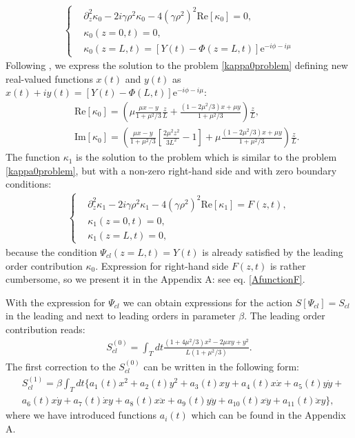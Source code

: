 \documentclass{article}
\begin{document}
\begin{eqnarray}\label{kappa0problem}
    \begin{cases}
        & \partial_{z}^{2}\kappa_{0} - 2i\gamma \rho^{2}\kappa_{0} - 4(\gamma \rho^{2})^{2}\textrm{Re}[\kappa_{0}] = 0, \\
        &\kappa_{0}(z=0,t) = 0, \\
        &\kappa_{0}(z=L,t) = \left[Y(t)-\Phi(z=L,t)\right]\textrm{e}^{-i\phi-i\mu} 
    \end{cases}
\end{eqnarray}
Following \cite{terekhov2017log}, we express the solution to the problem \eqref{kappa0problem} defining new real-valued functions $x(t)$ and $y(t)$ as $x(t) + iy(t) = \left[Y(t)-\Phi(L,t)\right]\textrm{e}^{-i\phi-i\mu}$: 
\begin{eqnarray}\label{kappa0eqs}
    &&\textrm{Re}[\kappa_{0}]=\left(\mu\frac{\mu x - y}{1+\mu^{2}/3}\frac{z}{L}+\frac{(1-2\mu^{2}/3)x+\mu y}{1+\mu^{2}/3}\right)\frac{z}{L},\nonumber\\
    &&\textrm{Im}[\kappa_{0}]=\left(\frac{\mu x - y}{1+\mu^{2}/3}\left[\frac{2\mu^{2}z^{2}}{3L^{2}}-1\right]+\mu\frac{(1-2\mu^{2}/3)x + \mu y}{1+\mu^{2}/3}\right)\frac{z}{L}.
\end{eqnarray}
The function $\kappa_{1}$ is the solution to the problem which is similar to the problem \eqref{kappa0problem}, but with a non-zero right-hand side and with zero boundary conditions: 
\begin{eqnarray}
    \begin{cases}
        & \partial_{z}^{2}\kappa_{1} - 2i\gamma \rho^{2}\kappa_{1} - 4(\gamma \rho^{2})^{2}\textrm{Re}[\kappa_{1}] = F(z,t), \\
        &\kappa_{1}(z=0,t) = 0, \\
        &\kappa_{1}(z=L,t) = 0,
    \end{cases}
\end{eqnarray}
because the condition $\Psi_{cl}(z=L,t) = Y(t)$ is already satisfied by the leading order contribution $\kappa_{0}$. Expression for right-hand side $F(z,t)$ is rather cumbersome, so we present it in the Appendix A: see eq. \eqref{AfunctionF}.

With the expression for $\Psi_{cl}$ we can obtain expressions for the action $S[\Psi_{cl}]=S_{cl}$ in the leading and next to leading orders in parameter $\beta$. The leading order contribution reads: 
\begin{eqnarray}\label{S_0clintegral}
    S_{cl}^{(0)} = \int_{T} dt \frac{(1+4\mu^{2}/3)x^{2} - 2\mu x y + y^{2}}{L(1+\mu^{2}/3)}.
\end{eqnarray}
The first correction to the $S_{cl}^{(0)}$ can be written in the following form:
\begin{eqnarray}\label{S_1clintegral}
    &\!S_{cl}^{(1)} = \beta \int_{T} dt \Big\{a_{1}(t)x^{2} + a_{2}(t)y^{2} + a_{3}(t)xy + a_{4}(t)x\dot{x} + a_{5}(t)y\dot{y} +\nonumber\\
    &\!a_{6}(t)x\dot{y} + a_{7}(t)\dot{x}y + a_{8}(t)x\ddot{x} + a_{9}(t)y\ddot{y} + a_{10}(t)x\ddot{y} + a_{11}(t)\ddot{x}y\Big\},
\end{eqnarray}
where we have introduced functions $a_{i}(t)$ which can be found in the Appendix A.
\end{document}
